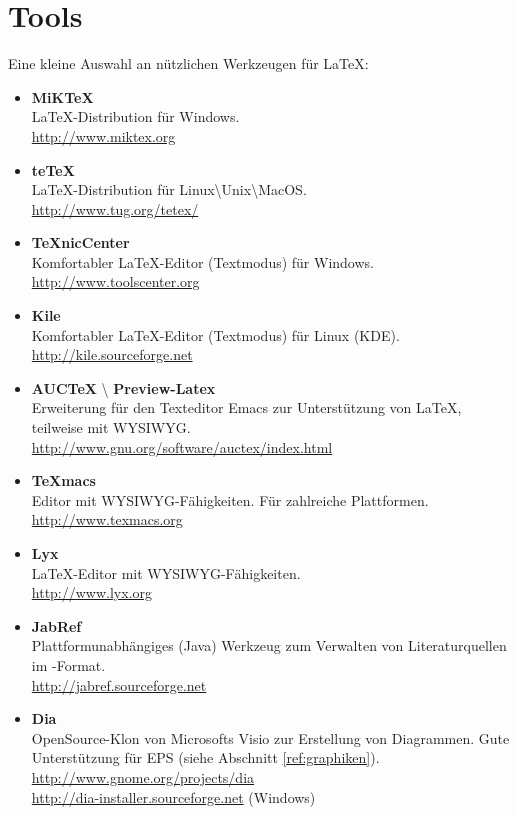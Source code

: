 \section{Tools}
\label{ref:tools}
Eine kleine Auswahl an nützlichen Werkzeugen für \LaTeX{}:
\begin{itemize}
	\item \textbf{MiKTeX}\\
		\LaTeX{}-Distribution für Windows.\\
		\guillemotright \url{http://www.miktex.org}
	\item \textbf{teTeX}\\
		\LaTeX{}-Distribution für Linux\textbackslash{}Unix\textbackslash{}MacOS.\\
		\guillemotright \url{http://www.tug.org/tetex/}
	\item \textbf{TeXnicCenter}\\
		Komfortabler \LaTeX{}-Editor (Textmodus) für Windows.\\
		\guillemotright \url{http://www.toolscenter.org}
	\item \textbf{Kile}\\
		Komfortabler \LaTeX{}-Editor (Textmodus) für Linux (KDE).\\
		\guillemotright \url{http://kile.sourceforge.net}
	\item \textbf{AUCTeX} \textbackslash{} \textbf{Preview-Latex}\\
		Erweiterung für den Texteditor Emacs zur Unterstützung von \LaTeX{}, teilweise mit WYSIWYG.\\
		\guillemotright \url{http://www.gnu.org/software/auctex/index.html}
	\item \textbf{TeXmacs}\\
		Editor mit WYSIWYG-Fähigkeiten. Für zahlreiche Plattformen.\\
		\guillemotright \url{http://www.texmacs.org}
	\item \textbf{Lyx}\\
		\LaTeX{}-Editor mit WYSIWYG-Fähigkeiten.\\
		\guillemotright \url{http://www.lyx.org}
	\item \textbf{JabRef}\\
		Plattformunabhängiges (Java) Werkzeug zum Verwalten von Literaturquellen im \BibTeX{}-Format.\\ 				
		\guillemotright \url{http://jabref.sourceforge.net}
	\item \textbf{Dia}\\
		OpenSource-Klon von Microsofts Visio zur Erstellung von Diagrammen. Gute Unterstützung für EPS 				(siehe Abschnitt \ref{ref:graphiken}).\\
		\guillemotright \url{http://www.gnome.org/projects/dia}\\
		\guillemotright \url{http://dia-installer.sourceforge.net} (Windows)
\end{itemize}
